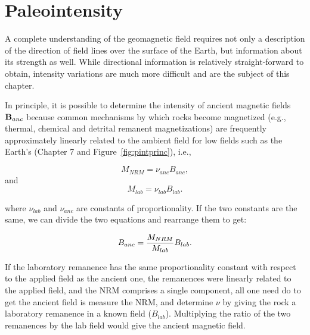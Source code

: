 \chapter{Paleointensity}





 A complete understanding of the geomagnetic field requires not only a description of the direction of field lines over the surface of the Earth, but information about its strength as well.  While directional information is relatively straight-forward to obtain, intensity variations are much more difficult and are the subject of  this chapter.


 In principle, it is possible to determine the
intensity of ancient magnetic fields $\hbox{\bf B}_{anc}$ because  common mechanisms
by which rocks become magnetized (e.g., thermal, chemical and detrital remanent
magnetizations) 
are frequently  approximately linearly related to the 
ambient field for
low fields such as the Earth's (Chapter 7 and Figure~\ref{fig:pintprinc}), i.e.,
 
 $$
 M_{NRM}   = \nu_{anc} B_{anc},
 $$
 \noindent and
 $$
 M_{lab}  =  \nu_{lab} B_{lab}.
 $$
 
\noindent  where $\nu_{lab}$ and $\nu_{anc}$ are constants of proportionality. If the two constants  are the same, we can divide the two  equations and rearrange them to get:

\begin{equation}
{B_{anc} }=  {M_{NRM} \over {M_{lab}}}{B_{lab} }.
\label{eq:banc}
\end{equation}
 
 \noindent  If the laboratory remanence has the same proportionality constant with respect to the applied field  as the ancient one,  the remanences  were linearly related to the applied field, and the NRM comprises a single component, all one need do  to get the ancient field is  measure the NRM,
and determine $\nu$ by giving the rock a laboratory remanence in a known field ($B_{lab}$).  Multiplying the ratio of the two remanences by the  lab field would give the ancient magnetic field.  
 
